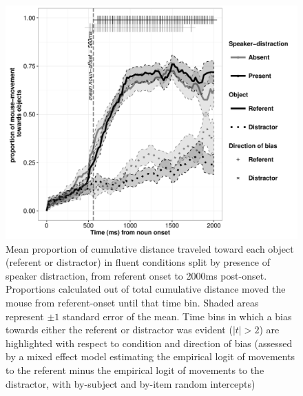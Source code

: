 \documentclass[a4paper,man,natbib]{apa6}
\begin{document}
\begin{figure}[Ht]
  \centering
	\includegraphics[width=\linewidth]{mouse_fl.pdf}
  \caption{Mean proportion of cumulative distance traveled toward each object (referent or distractor) in fluent conditions split by presence of speaker distraction, from referent onset to 2000ms post-onset. Proportions calculated out of total cumulative distance moved the mouse from referent-onset until that time bin. Shaded areas represent $\pm 1$ standard error of the mean. Time bins in which a bias towards either the referent or distractor was evident ($|t|>2$) are highlighted with respect to condition and direction of bias (assessed by a mixed effect model estimating the empirical logit of movements to the referent minus the empirical logit of movements to the distractor, with by-subject and by-item random intercepts)}
  \label{fig:mflu}
\end{figure}
\end{document}
